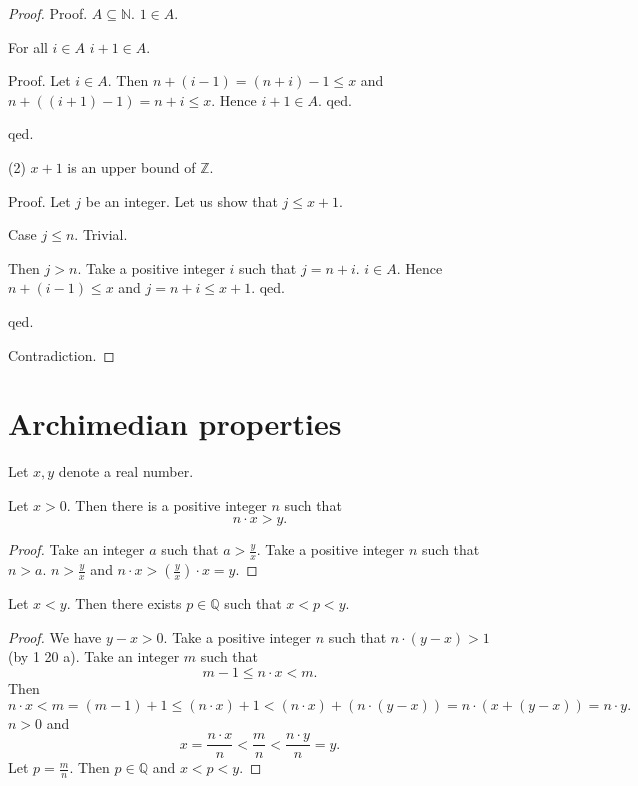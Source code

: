 \documentclass{article}
\begin{document}
\begin{forthel}
\begin{proof}
Proof.
$A \subseteq \mathbb{N}$.
$1 \in A$.

For all $i \in A$ $i + 1 \in A$.

  Proof. Let $i \in A$. Then
  $n + (i -1) = (n + i) - 1 \leq x$ and
  $n + ((i + 1) - 1) = n + i \leq x$.
  Hence $i + 1 \in A$.
  qed.

qed.

(2) $x + 1$ is an upper bound of $\mathbb{Z}$.

Proof.
Let $j$ be an integer. Let us show that $j \leq x + 1$.

Case $j \leq n$. Trivial.

Then $j > n$. Take a positive integer $i$
such that $j = n + i$. $i \in A$.
Hence $n + (i-1) \leq x$ and $j = n+i \leq x + 1$.
qed.

qed.

Contradiction.
\end{proof}

\end{forthel}


\section{Archimedian properties}

\begin{forthel}
Let $x,y$ denote a real number.

\begin{theorem}[1 20 a]
Let $x > 0$.
Then there is a
positive integer $n$ such that \[ n \cdot x > y. \]
\end{theorem}
\begin{proof}
Take an integer $a$ such that $a > \frac{y}{x}$.
Take a positive integer $n$ such that $n > a$.
$n > \frac{y}{x}$ and $n \cdot x > (\frac{y}{x}) \cdot x = y$.
\end{proof}

\begin{theorem}[1 20 b]
Let $x < y$. Then there exists
$p \in \mathbb{Q}$ such that $x < p < y$.
\end{theorem}
\begin{proof}
We have $y - x > 0$.
Take a positive integer $n$ such that
$n\cdot (y-x) > 1$ (by 1 20 a).
Take an integer $m$ such that
\[ m -1 \leq n \cdot x < m. \]
Then
\[ n \cdot x < m = (m - 1) + 1 \leq (n\cdot x) + 1 <
(n\cdot x) + (n\cdot (y-x)) = n \cdot (x + (y - x)) = n \cdot y. \]
$n > 0$ and
\[ x = \frac{n\cdot x}{n} < \frac{m}{n} < \frac{n\cdot y}{n} = y. \]
Let $p = \frac{m}{n}$. Then $p \in \mathbb{Q}$ and $x < p < y$.
\end{proof}

\end{forthel}

\printbibliography
\end{document}
